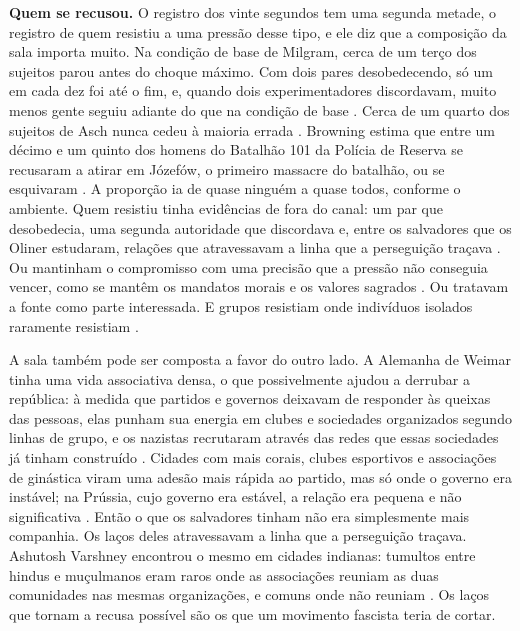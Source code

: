 \textbf{Quem se recusou.} O registro dos vinte segundos tem uma segunda metade, o registro de quem resistiu a uma pressão desse tipo, e ele diz que a composição da sala importa muito. Na condição de base de Milgram, cerca de um terço dos sujeitos parou antes do choque máximo. Com dois pares desobedecendo, só um em cada dez foi até o fim, e, quando dois experimentadores discordavam, muito menos gente seguiu adiante do que na condição de base \autocite{milgram1974obedience}. Cerca de um quarto dos sujeitos de Asch nunca cedeu à maioria errada \autocite{asch1956studies}. Browning estima que entre um décimo e um quinto dos homens do Batalhão 101 da Polícia de Reserva se recusaram a atirar em Józefów, o primeiro massacre do batalhão, ou se esquivaram \autocite{browning1992ordinary}. A proporção ia de quase ninguém a quase todos, conforme o ambiente. Quem resistiu tinha evidências de fora do canal: um par que desobedecia, uma segunda autoridade que discordava e, entre os salvadores que os Oliner estudaram, relações que atravessavam a linha que a perseguição traçava \autocite{oliner1988altruistic}. Ou mantinham o compromisso com uma precisão que a pressão não conseguia vencer, como se mantêm os mandatos morais e os valores sagrados \autocite{skitka2009limits,ginges2007sacred}. Ou tratavam a fonte como parte interessada. E grupos resistiam onde indivíduos isolados raramente resistiam \autocite{gamson1982encounters}.

A sala também pode ser composta a favor do outro lado. A Alemanha de Weimar tinha uma vida associativa densa, o que possivelmente ajudou a derrubar a república: à medida que partidos e governos deixavam de responder às queixas das pessoas, elas punham sua energia em clubes e sociedades organizados segundo linhas de grupo, e os nazistas recrutaram através das redes que essas sociedades já tinham construído \autocite{berman1997weimar}. Cidades com mais corais, clubes esportivos e associações de ginástica viram uma adesão mais rápida ao partido, mas só onde o governo era instável; na Prússia, cujo governo era estável, a relação era pequena e não significativa \autocite{satyanath2017bowling}. Então o que os salvadores tinham não era simplesmente mais companhia. Os laços deles atravessavam a linha que a perseguição traçava. Ashutosh Varshney encontrou o mesmo em cidades indianas: tumultos entre hindus e muçulmanos eram raros onde as associações reuniam as duas comunidades nas mesmas organizações, e comuns onde não reuniam \autocite{varshney2002ethnic}. Os laços que tornam a recusa possível são os que um movimento fascista teria de cortar.

